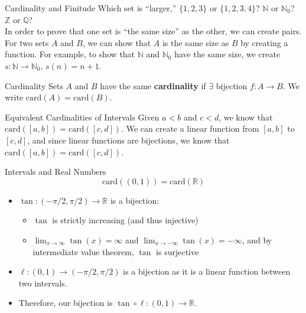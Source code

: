 \documentclass[8pt]{extarticle}
\begin{document}
  \begin{problem}{Cardinality and Finitude}
    Which set is ``larger,'' $\{1,2,3\}$ or $\{1,2,3,4\}$? $\mathbb{N}$ or $\mathbb{N}_0$? $\mathbb{Z}$ or $\mathbb{Q}$?\\

    In order to prove that one set is ``the same size'' as the other, we can create pairs. For two sets $A$ and $B$, we can show that $A$ is the same size as $B$ by creating a function. For example, to show that $\mathbb{N}$ and $\mathbb{N}_0$ have the same size, we create $s:\mathbb{N} \rightarrow \mathbb{N}_0$, $s(n) = n+1$.

    \begin{problem}{Cardinality}
      Sets $A$ and $B$ have the same \textbf{cardinality} if $\exists$ bijection $f:A\rightarrow B$. We write $\textrm{card}(A) = \textrm{card}(B)$.
    \end{problem}
    \begin{problem}{Equivalent Cardinalities of Intervals}
      Given $a<b$ and $c<d$, we know that $\textrm{card}\left([a,b]\right) = \textrm{card}\left([c,d]\right)$.
      \tcblower
      We can create a linear function from $[a,b]$ to $[c,d]$, and since linear functions are bijections, we know that $\textrm{card}\left([a,b]\right) = \textrm{card}\left([c,d]\right)$.
    \end{problem}
    \begin{problem}{Intervals and Real Numbers}
      \[
        \textrm{card}\left((0,1)\right) = \textrm{card}(\mathbb{R})
      \] 
      \tcblower
      \begin{itemize}
        \item $\tan: (-\pi/2,\pi/2) \rightarrow \mathbb{R}$ is a bijection:
          \begin{itemize}
            \item $\tan$ is strictly increasing (and thus injective)
            \item $\lim_{x\rightarrow\infty} \tan(x) = \infty$ and $\lim_{x\rightarrow -\infty}\tan(x) = -\infty$, and by intermediate value theorem, $\tan$ is surjective
          \end{itemize}
        \item $\ell: (0,1) \rightarrow (-\pi/2,\pi/2)$ is a bijection as it is a linear function between two intervals.
        \item Therefore, our bijection is $\tan \circ \ell: (0,1) \rightarrow \mathbb{R}$.
      \end{itemize}
    \end{problem}

\end{problem}
\end{document}
